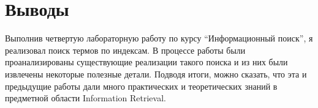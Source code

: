 \section{Выводы}

Выполнив четвертую лабораторную работу по курсу \enquote{Информационный поиск}, я реализовал поиск термов по индексам. В процессе работы были проанализированы существующие реализации такого поиска и из них были извлечены некоторые полезные детали. Подводя итоги, можно сказать, что эта и предыдущие работы дали много практических и теоретических знаний в предметной области Information Retrieval.
\pagebreak
